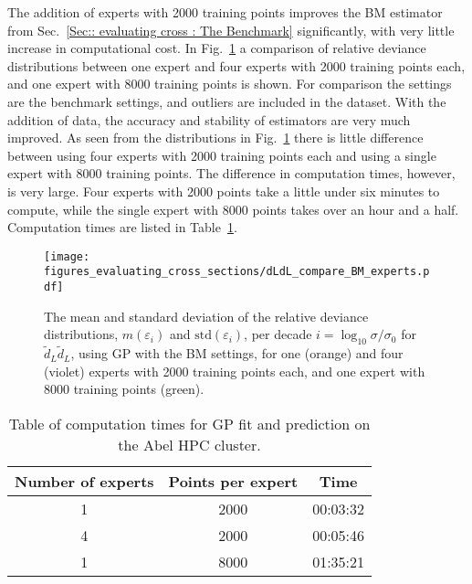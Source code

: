\documentclass[twoside,english]{uiofysmaster}
\begin{document}
{{The addition of experts with 2000 training points improves the BM estimator from Sec.~\ref{Sec:: evaluating cross : The Benchmark} significantly, with very little increase in computational cost. In Fig.~\ref{Fig:: evaluating cross : compare 1 vs 4 expert dLdL} a comparison of relative deviance distributions between one expert and four experts with 2000 training points each, and one expert with 8000 training points is shown.  For comparison the settings are the benchmark settings, and outliers are included in the dataset. With the addition of data, the accuracy and stability of estimators are very much improved. As seen from the distributions in Fig.~\ref{Fig:: evaluating cross : compare 1 vs 4 expert dLdL} there is little difference between using four experts with 2000 training points each and using a single expert with 8000 training points. The difference in computation times, however, is very large. Four experts with 2000 points take a little under six minutes to compute, while the single expert with 8000 points takes over an hour and a half. Computation times are listed in Table~\ref{Tab:: evaluating cross : computation times experts BM}.

\begin{figure}
\centering
\texttt{[image: figures\_evaluating\_cross\_sections/dLdL\_compare\_BM\_experts.pdf]}
\caption{The mean and standard deviation of the relative deviance distributions, $m(\varepsilon_i)$ and $\mathrm{std}(\varepsilon_i)$, per decade $i = \log_{10} \sigma / \sigma_0$ for $\widetilde{d}_L \widetilde{d}_L$, using GP with the BM settings, for one (orange) and four (violet) experts with 2000 training points each, and one expert with 8000 training points (green).}
\label{Fig:: evaluating cross : compare 1 vs 4 expert dLdL}
\end{figure}  

\begin{table}
\centering
\begin{tabular}{@{}ccc@{}} \toprule
Number of experts & Points per expert & Time\\
\midrule
1 & 2000 & 00:03:32\\
4 & 2000 & 00:05:46\\
1 & 8000 & 01:35:21\\ \bottomrule
\end{tabular}
\caption{Table of computation times for GP fit and prediction on the Abel HPC cluster.}
\label{Tab:: evaluating cross : computation times experts BM}
\end{table}

}}
\end{document}
